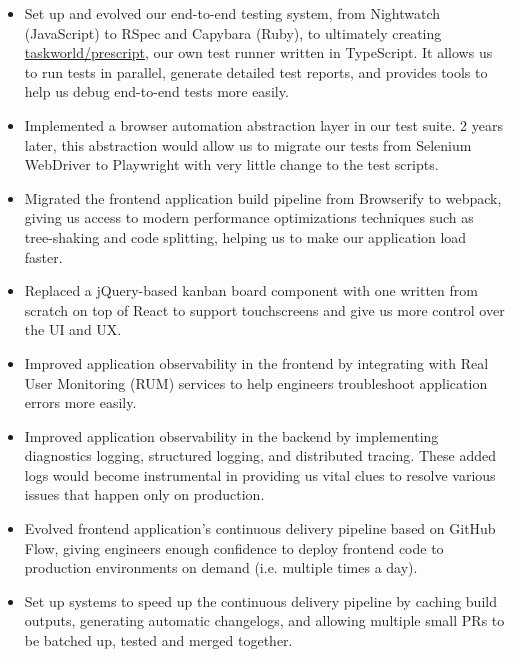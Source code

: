 \documentclass[a4paper]{article}
\newcommand{\github} [1] {\href{https://github.com/#1}{#1}}
\begin{document}
\begin{itemize} \itemsep 1pt
    
	\item Set up and evolved our end-to-end testing system, from Nightwatch (JavaScript) to RSpec and Capybara (Ruby), to ultimately creating \github{taskworld/prescript}, our own test runner written in TypeScript. It allows us to run tests in parallel, generate detailed test reports, and provides tools to help us debug end-to-end tests more easily.
    
	\item Implemented a browser automation abstraction layer in our test suite. 2 years later, this abstraction would allow us to migrate our tests from Selenium WebDriver to Playwright with very little change to the test scripts.
    
	\item Migrated the frontend application build pipeline from Browserify to webpack, giving us access to modern performance optimizations techniques such as tree-shaking and code splitting, helping us to make our application load faster.
    
	\item Replaced a jQuery-based kanban board component with one written from scratch on top of React to support touchscreens and give us more control over the UI and UX.
    
	\item Improved application observability in the frontend by integrating with Real User Monitoring (RUM) services to help engineers troubleshoot application errors more easily.
    
	\item Improved application observability in the backend by implementing diagnostics logging, structured logging, and distributed tracing. These added logs would become instrumental in providing us vital clues to resolve various issues that happen only on production.
    
	\item Evolved frontend application’s continuous delivery pipeline based on GitHub Flow, giving engineers enough confidence to deploy frontend code to production environments on demand (i.e. multiple times a day).
    
	\item Set up systems to speed up the continuous delivery pipeline by caching build outputs, generating automatic changelogs, and allowing multiple small PRs to be batched up, tested and merged together.
    

\end{itemize}
\end{document}
